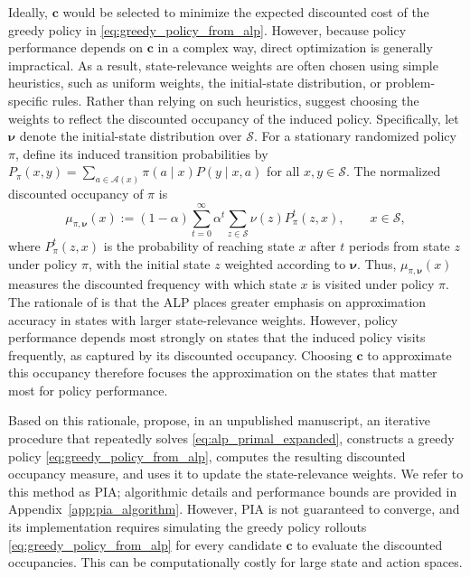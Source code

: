 \documentclass[sglanonrev]{informs4}
\providecommand{\bc}{\boldsymbol{c}}
\providecommand{\bnu}{\boldsymbol{\nu}}
\def\edits#1{{\color{black}#1}}
\begin{document}
\edits{Ideally, $\bc$ would be selected to minimize the expected discounted cost of the greedy policy in \eqref{eq:greedy_policy_from_alp}. However, because policy performance depends on $\bc$ in a complex way, direct optimization is generally impractical. As a result, state-relevance weights are often chosen using simple heuristics, such as uniform weights, the initial-state distribution, or problem-specific rules. Rather than relying on such heuristics,} \citet{de2003linear} suggest choosing the weights to reflect the discounted occupancy of the induced policy. Specifically, let $\bnu$ denote the initial-state distribution over $\mathcal S$. For a stationary randomized policy $\pi$, define its induced transition probabilities by
$
P_\pi(x,y)
=
\sum_{a\in\mathcal A(x)}
\pi(a\mid x)P(y\mid x,a)
$
for all $x,y\in\mathcal S$. The normalized discounted occupancy of $\pi$ is
\begin{equation}
\label{eq:discounted_occupancy}
\mu_{\pi,\bnu}(x)
:=
(1-\alpha)
\sum_{t=0}^{\infty}\alpha^t
\sum_{z\in\mathcal S}\nu(z)P_\pi^t(z,x),
\qquad x\in\mathcal S,
\end{equation}
where $P_\pi^t(z,x)$ is the probability of reaching state $x$ after $t$ periods from state $z$ under policy $\pi$, with the initial state $z$ weighted according to $\bnu$. Thus, $\mu_{\pi,\bnu}(x)$ measures the discounted frequency with which state $x$ is visited under policy $\pi$. \edits{The rationale of \citet{de2003linear} is that the \ac{ALP} places greater emphasis on approximation accuracy in states with larger state-relevance weights. However, policy performance depends most strongly on states that the induced policy visits frequently, as captured by its discounted occupancy. Choosing $\bc$ to approximate this occupancy therefore focuses the approximation on the states that matter most for policy performance.}

Based on this rationale, \citet{le2004choose} propose, in an unpublished manuscript, an iterative procedure that repeatedly solves \eqref{eq:alp_primal_expanded}, constructs a greedy policy \eqref{eq:greedy_policy_from_alp}, computes the resulting discounted occupancy measure, and uses it to update the state-relevance weights. We refer to this method as \ac{PIA}; algorithmic details and performance bounds are provided in Appendix~\ref{app:pia_algorithm}. However, \ac{PIA} is not guaranteed to converge, and its implementation requires simulating \edits{the greedy policy rollouts \eqref{eq:greedy_policy_from_alp} for every candidate $\bc$ to evaluate the discounted occupancies. This can be computationally costly for large state and action spaces.} 
\end{document}
